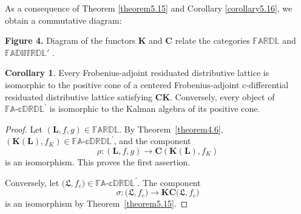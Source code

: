 \documentclass[final,12pt,times]{elsarticle}
\theoremstyle{plain}
\theoremstyle{definition}
\newtheorem{corollary}[definition]{Corollary}
\theoremstyle{break}
\newcommand{\FARDL}{\mathbb{FARDL}}
\newcommand{\CFADp}{\mathbb{FA\text{-}cDRDL}^{\prime}}
\newcommand{\Kfun}{\mathbf K}
\newcommand{\Cfun}{\mathbf C}
\begin{document}
As a consequence of Theorem \ref{theorem5.15} and Corollary \ref{corollary5.16}, we obtain a commutative diagram:
\begin{center}
\begin{center}  {\bf{Figure 4.}} Diagram of the functors $\mathbf{K}$ and $\mathbf{C}$ relate the categories $\mathbb{FARDL}$ and $\mathbb{FAD\text{iff}RDL'}$ .
\end{center}
\end{center}


\begin{corollary}\label{cor:representation}
Every Frobenius-adjoint residuated distributive lattice is isomorphic
to the positive cone of a centered Frobenius-adjoint c-differential residuated
distributive lattice satisfying $\mathbf{CK}$.  Conversely, every object of
$\CFADp$ is isomorphic to the Kalman algebra of its positive cone.
\end{corollary}

\begin{proof}
Let $(\mathbf{L},f,g)\in\FARDL$.  By Theorem~\ref{theorem4.6},
$(\Kfun(\mathbf{L}),f_K)\in\CFADp$, and the component
\[
 \rho:(\mathbf{L},f,g)\longrightarrow\Cfun(\Kfun(\mathbf{L}),f_K)
\]
is an isomorphism.  This proves the first assertion.

Conversely, let $\boldsymbol{(\mathfrak{L}},f_c)\in\CFADp$.  The component
\[
 \sigma:
 \boldsymbol{(\mathfrak{L}},f_c)
 \longrightarrow
 \Kfun\Cfun\boldsymbol{(\mathfrak{L}},f_c)
\]
is an isomorphism by Theorem~\ref{theorem5.15}. 
\end{proof}
\end{document}
